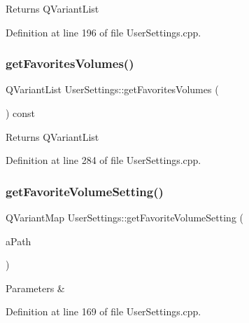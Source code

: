 \begin{DoxyReturn}{Returns}
Q\+Variant\+List 
\end{DoxyReturn}


Definition at line 196 of file User\+Settings.\+cpp.

\mbox{\label{class_user_settings_a06599c66844e76880b3f8f220662ce4c}} 
\subsubsection{\texorpdfstring{get\+Favorites\+Volumes()}{getFavoritesVolumes()}}
{\footnotesize\ttfamily Q\+Variant\+List User\+Settings\+::get\+Favorites\+Volumes (\begin{DoxyParamCaption}{ }\end{DoxyParamCaption}) const}

\begin{DoxyReturn}{Returns}
Q\+Variant\+List 
\end{DoxyReturn}


Definition at line 284 of file User\+Settings.\+cpp.

\mbox{\label{class_user_settings_ae86ded971587f1e26fe198f0f1b4d176}} 
\subsubsection{\texorpdfstring{get\+Favorite\+Volume\+Setting()}{getFavoriteVolumeSetting()}}
{\footnotesize\ttfamily Q\+Variant\+Map User\+Settings\+::get\+Favorite\+Volume\+Setting (\begin{DoxyParamCaption}\item[{const Q\+String \&}]{a\+Path }\end{DoxyParamCaption})}


\begin{DoxyParams}{Parameters}
{\em } & \\
\hline
\end{DoxyParams}


Definition at line 169 of file User\+Settings.\+cpp.

